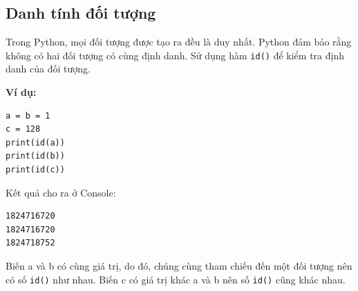 \subsection{Danh tính đối tượng}
Trong Python, mọi đối tượng được tạo ra đều là duy nhất. Python đảm bảo rằng không có hai đối tượng có cùng định danh. Sử dụng hàm \texttt{id()} để kiểm tra định danh của đối tượng.\par
\textbf{Ví dụ:}
\begin{lstlisting}
a = b = 1
c = 128
print(id(a))
print(id(b))
print(id(c))
\end{lstlisting}
Kết quả cho ra ở Console:
\begin{lstlisting}
1824716720
1824716720
1824718752
\end{lstlisting}
Biến a và b có cùng giá trị, do đó, chúng cùng tham chiếu đến một đối tượng nên có số \texttt{id()} như nhau. Biến c có giá trị khác a và b nên số \texttt{id()} cũng khác nhau.
\newpage